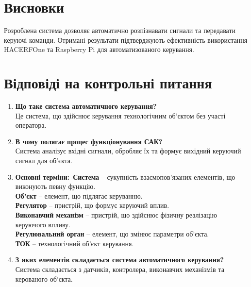 \documentclass[a4paper]{article}
\begin{document}
\section*{Висновки}
Розроблена система дозволяє автоматично розпізнавати сигнали та передавати керуючі команди. Отримані результати підтверджують ефективність використання HACERFOne та Raspberry Pi для автоматизованого керування.

\section*{Відповіді на контрольні питання}
\begin{enumerate}
    \item \textbf{Що таке система автоматичного керування?}\\
    Це система, що здійснює керування технологічним об'єктом без участі оператора.
    \item \textbf{В чому полягає процес функціонування САК?}\\
    Система аналізує вхідні сигнали, обробляє їх та формує вихідний керуючий сигнал для об'єкта.
    \item \textbf{Основні терміни:}\
    \textbf{Система} – сукупність взаємопов'язаних елементів, що виконують певну функцію.\\
    \textbf{Об’єкт} – елемент, що підлягає керуванню.\\
    \textbf{Регулятор} – пристрій, що формує керуючий вплив.\\
    \textbf{Виконавчий механізм} – пристрій, що здійснює фізичну реалізацію керуючого впливу.\\
    \textbf{Регулювальний орган} – елемент, що змінює параметри об'єкта.\\
    \textbf{ТОК} – технологічний об'єкт керування.
    \item \textbf{З яких елементів складається система автоматичного керування?}\\
    Система складається з датчиків, контролера, виконавчих механізмів та керованого об'єкта.
\end{enumerate}
\end{document}
